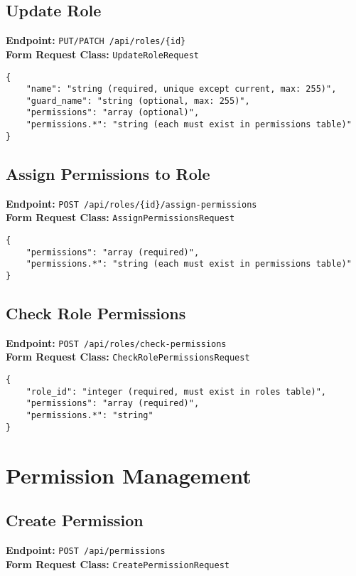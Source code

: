 \documentclass[12pt,a4paper]{article}
\begin{document}
\subsection{Update Role}
\textbf{Endpoint:} \texttt{PUT/PATCH /api/roles/\{id\}}\\
\textbf{Form Request Class:} \texttt{UpdateRoleRequest}

\begin{lstlisting}[caption=Update Role Request Body]
{
    "name": "string (required, unique except current, max: 255)",
    "guard_name": "string (optional, max: 255)",
    "permissions": "array (optional)",
    "permissions.*": "string (each must exist in permissions table)"
}
\end{lstlisting}

\subsection{Assign Permissions to Role}
\textbf{Endpoint:} \texttt{POST /api/roles/\{id\}/assign-permissions}\\
\textbf{Form Request Class:} \texttt{AssignPermissionsRequest}

\begin{lstlisting}[caption=Assign Permissions Request Body]
{
    "permissions": "array (required)",
    "permissions.*": "string (each must exist in permissions table)"
}
\end{lstlisting}

\subsection{Check Role Permissions}
\textbf{Endpoint:} \texttt{POST /api/roles/check-permissions}\\
\textbf{Form Request Class:} \texttt{CheckRolePermissionsRequest}

\begin{lstlisting}[caption=Check Role Permissions Request Body]
{
    "role_id": "integer (required, must exist in roles table)",
    "permissions": "array (required)",
    "permissions.*": "string"
}
\end{lstlisting}

\section{Permission Management}

\subsection{Create Permission}
\textbf{Endpoint:} \texttt{POST /api/permissions}\\
\textbf{Form Request Class:} \texttt{CreatePermissionRequest}
\end{document}

